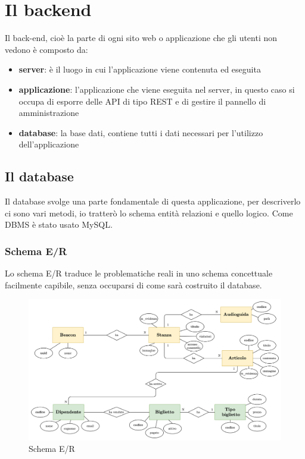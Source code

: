 \documentclass[12pt]{article}
\begin{document}

\clearpage
\section{Il backend}
Il back-end, cioè la parte di ogni sito web o applicazione che gli utenti non vedono è composto da:
\begin{itemize}
    \item \textbf{server}: è il luogo in cui l'applicazione viene contenuta ed eseguita
    \item \textbf{applicazione}: l'applicazione che viene eseguita nel server, in questo caso si occupa di esporre delle API di tipo REST e di gestire il pannello di amministrazione
    \item \textbf{database}: la base dati, contiene tutti i dati necessari per l'utilizzo dell'applicazione  
\end{itemize}

\subsection{Il database}

Il database svolge una parte fondamentale di questa applicazione, per descriverlo ci sono vari metodi, io tratterò lo schema entità relazioni e quello logico. Come DBMS è stato usato MySQL.

\subsubsection{Schema E/R}
Lo schema E/R traduce le problematiche reali in uno  schema concettuale facilmente capibile, senza occuparsi di come sarà costruito il database.

\begin{center}
    \begin{figure}[htp]
        \centering
        \includegraphics[width=14cm]{diagrams/er_scheme.png}
        \caption{Schema E/R}
        \label{fig:er}
    \end{figure}
\end{center}
\end{document}
